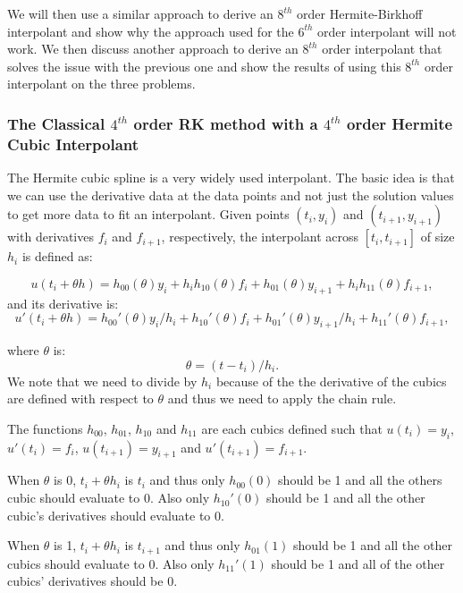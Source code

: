 \documentclass{article}
\begin{document}
We will then use a similar approach to derive an $8^{th}$ order Hermite-Birkhoff interpolant and show why the approach used for the $6^{th}$ order interpolant will not work. We then discuss another approach to derive an $8^{th}$ order interpolant that solves the issue with the previous one and show the results of using this $8^{th}$ order interpolant on the three problems.


\subsubsection{The Classical $4^{th}$ order RK method with a $4^{th}$ order Hermite Cubic Interpolant}
The Hermite cubic spline is a very widely used interpolant. The basic idea is that we can use the derivative data at the data points and not just the solution values to get more data to fit an interpolant. Given points $(t_i, y_i)$ and $(t_{i + 1}, y_{i + 1})$ with derivatives $f_i$ and $f_{i + 1}$, respectively, the interpolant across $[t_i, t_{i + 1}]$ of size $h_i$ is defined as:

\begin{equation}
\label{eqn:HB4}
u(t_i + \theta h) = h_{00}(\theta)y_i +  h_ih_{10}(\theta)f_i + h_{01}(\theta)y_{i + 1} + h_ih_{11}(\theta)f_{i + 1}, 
\end{equation}
and its derivative is:
\begin{equation}
u'(t_i + \theta h) = h_{00}'(\theta)y_i/h_i +  h_{10}'(\theta)f_i + h_{01}'(\theta)y_{i + 1}/h_i + h_{11}'(\theta)f_{i + 1}, 
\end{equation}

where $\theta$ is:
\begin{equation}
\label{eqn:HB4_theta}
\theta = (t - t_i) / h_i.
\end{equation}
We note that we need to divide by $h_i$ because of the the derivative of the cubics are defined with respect to $\theta$ and thus we need to apply the chain rule.

The functions $h_{00}$, $h_{01}$, $h_{10}$ and $h_{11}$ are each cubics defined such that $u(t_i)= y_i$, $u'(t_i) = f_i$, $u(t_{i+1}) = y_{i + 1}$ and $u'(t_{i + 1}) = f_{i + 1}$.

When $\theta$ is 0, $t_i + \theta h_i$ is $t_i$ and thus only $h_{00}(0)$ should be 1 and all the others cubic should evaluate to 0. Also only $h_{10}'(0)$ should be 1 and all the other cubic's derivatives should evaluate to 0.

When $\theta$ is 1, $t_i + \theta h_i$ is $t_{i + 1}$ and thus only $h_{01}(1)$ should be 1 and all the other cubics should evaluate to 0. Also only $h_{11}'(1)$ should be 1 and all of the other cubics' derivatives should be 0.
\end{document}
